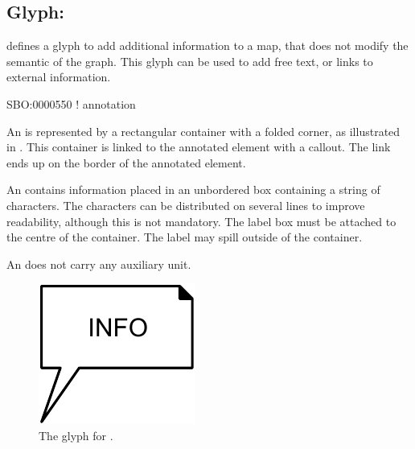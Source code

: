 
\subsection{Glyph: }
\label{sec:annotation}

\SBGNAFLone defines a glyph to add additional information to a map, that does not modify the semantic of the graph. This glyph can be used to add free text, or links to external information.

\begin{glyphDescription}

\glyphSboTerm SBO:0000550 ! annotation

\glyphContainer An  is represented by a rectangular container with a folded corner, as illustrated in . This container is linked to the annotated element with a callout. The link ends up on the border of the annotated element.

\glyphLabel An  contains information placed in an unbordered box containing a string of characters.  The characters can be distributed on several lines to improve readability, although this is not mandatory.  The label box must be attached to the centre of the container. The label may spill outside of the container. 

\glyphAux An  does not carry any auxiliary unit.
\end{glyphDescription}

\begin{figure}[H]
  \centering
  \includegraphics[scale = 1]{images/build/annotation.pdf}
  \caption{The \AF glyph for .}
  \label{fig:annotation}
\end{figure}


